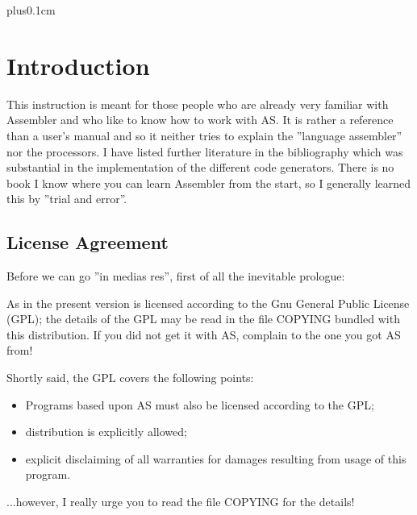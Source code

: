 \documentclass[12pt,twoside]{report}
\begin{document}
{\parskip 0cm plus0.1cm \tableofcontents}


\cleardoublepage
\chapter{Introduction}

This instruction is meant for those people who are already very familiar
with Assembler and who like to know how to work with AS.  It is rather a
reference than a user's manual and so it neither tries to explain the
''language assembler'' nor the processors.  I have listed further
literature in the bibliography which was substantial in the implementation
of the different code generators.  There is no book I know where you can
learn Assembler from the start, so I generally learned this by ''trial and
error''.


\section{License Agreement}
\label{SectLicense}

Before we can go ''in medias res'', first of all the inevitable prologue:

As in the present version is licensed according to the Gnu General Public
License (GPL); the details of the GPL may be read in the file COPYING
bundled with this distribution.  If you did not get it with AS, complain
to the one you got AS from!

Shortly said, the GPL covers the following points:
\begin{itemize}
\item{Programs based upon AS must also be licensed according to the GPL;}
\item{distribution is explicitly allowed;}
\item{explicit disclaiming of all warranties for damages resulting from
      usage of this program.}
\end{itemize}
...however, I really urge you to read the file COPYING for the details!
\end{document}
